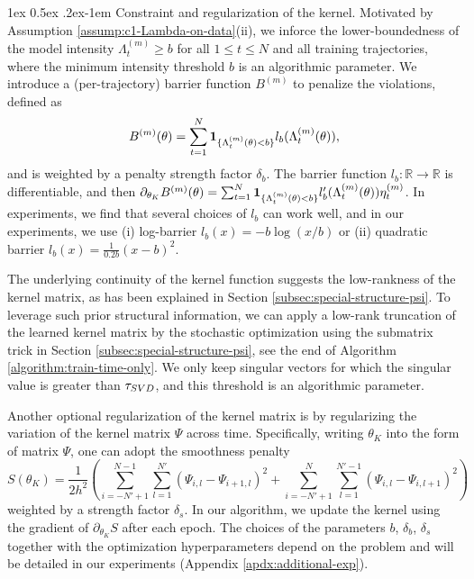 \documentclass[11pt]{article}
\makeatletter
\theoremstyle{remark}
\theoremstyle{plain}
\newcommand{\R}{\mathbb{R}}
\renewcommand{\paragraph}{%
  \@startsection{paragraph}{4}%
  {\z@}{1ex \@plus 0.5ex \@minus .2ex}{-1em}%
  {\normalfont\normalsize\itshape}%
}
\makeatother
\begin{document}
\paragraph{Constraint and regularization of the kernel.}
Motivated by Assumption \ref{assump:c1-Lambda-on-data}(ii), 
we inforce the lower-boundedness of the model intensity $\Lambda^{(m)}_t \ge b$ for all $1 \le t \le N$  and all training trajectories, where the minimum intensity threshold $b$ is an algorithmic parameter. 
We introduce a (per-trajectory) barrier function $B^{(m)}$ to penalize the violations, defined as 
\begin{equation}\label{eq:def-Bm-barrier}
B^{(m)}(\theta) = \sum_{t=1}^N {\bf 1}_{  \{ \Lambda^{(m)}_t (\theta) < b \}} l_b( \Lambda^{(m)}_t (\theta) ),
\end{equation}
and is weighted by a penalty strength factor $\delta_b$. 
The barrier function $l_b: \R \to \R$ is differentiable, and then $\partial_{\theta_K}B^{(m)}(\theta) 
	= \sum_{t=1}^N {\bf 1}_{  \{ \Lambda^{(m)}_t (\theta) < b \}} l_b'( \Lambda^{(m)}_t (\theta) ) \eta^{(m)}_t$.
In experiments, we find that several choices of $l_b$ can work well, and in our experiments, we use
(i) log-barrier $l_b(x) = -b \log (x/b) $
or 
(ii) quadratic barrier $l_b(x) = \frac{1}{ 0.2   b}(x - b)^2 $.

The underlying continuity of the kernel function suggests the low-rankness of the kernel matrix, as has been explained in Section \ref{subsec:special-structure-psi}. 
To leverage such prior structural information, we can apply a low-rank truncation of the learned kernel matrix by the stochastic optimization using the submatrix trick in Section \ref{subsec:special-structure-psi}, see the end of Algorithm \ref{algorithm:train-time-only}. We only keep singular vectors for which the singular value is greater than  $\tau_{\rm SVD}$, and this threshold is an algorithmic parameter.

Another optional regularization of the kernel matrix is by regularizing the variation of the kernel matrix $\Psi$ across time. Specifically, writing $\theta_K$ into the form of matrix $\Psi$, one can adopt the smoothness penalty 
\begin{equation}\label{eq:def-Stheta-smoothness}
S(\theta_K) 
	= \frac{1}{2 h^2} \left( \sum_{i=-N'+1}^{N-1} \sum_{l=1}^{N'}  (\Psi_{i,l} - \Psi_{i+1,l})^2 
	+ \sum_{i=-N'+1}^{N} \sum_{l=1}^{N'-1} (\Psi_{i,l} - \Psi_{i,l+1})^2 \right)
\end{equation}
 weighted by a strength factor $\delta_s$. In our algorithm, we update the kernel using the gradient of $\partial_{\theta_K} S$ after each epoch. 
 The choices of the parameters $b$, $\delta_b$, $\delta_s$ 
 together with the optimization hyperparameters 
 depend on the problem and will be detailed in our experiments (Appendix \ref{apdx:additional-exp}).
\end{document}
